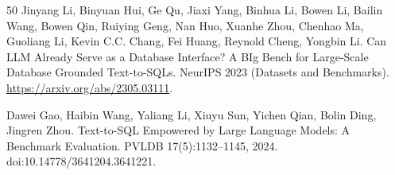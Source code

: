 \documentclass[sigconf, nonacm]{acmart}
\begin{document}
\begin{thebibliography}{50}
Jinyang Li, Binyuan Hui, Ge Qu, Jiaxi Yang, Binhua Li, Bowen Li, Bailin Wang, Bowen Qin, Ruiying Geng, Nan Huo, Xuanhe Zhou, Chenhao Ma, Guoliang Li, Kevin C.C. Chang, Fei Huang, Reynold Cheng, Yongbin Li. Can LLM Already Serve as a Database Interface? A BIg Bench for Large-Scale Database Grounded Text-to-SQLs. NeurIPS 2023 (Datasets and Benchmarks). \url{https://arxiv.org/abs/2305.03111}.

Dawei Gao, Haibin Wang, Yaliang Li, Xiuyu Sun, Yichen Qian, Bolin Ding, Jingren Zhou. Text-to-SQL Empowered by Large Language Models: A Benchmark Evaluation. PVLDB 17(5):1132--1145, 2024. doi:10.14778/3641204.3641221.

\end{thebibliography}
\end{document}
